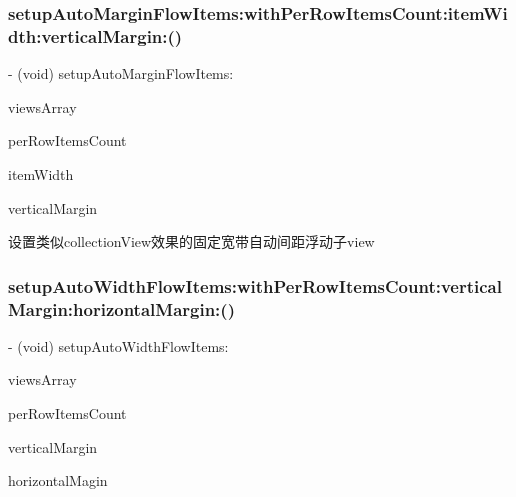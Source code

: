 \subsubsection{\texorpdfstring{setup\+Auto\+Margin\+Flow\+Items\+:with\+Per\+Row\+Items\+Count\+:item\+Width\+:vertical\+Margin\+:()}{setupAutoMarginFlowItems:withPerRowItemsCount:itemWidth:verticalMargin:()}\hspace{0.1cm}{\footnotesize\ttfamily [3/3]}}
{\footnotesize\ttfamily -\/ (void) setup\+Auto\+Margin\+Flow\+Items\+: \begin{DoxyParamCaption}\item[{(N\+S\+Array $\ast$)}]{views\+Array }\item[{withPerRowItemsCount:(N\+S\+Integer)}]{per\+Row\+Items\+Count }\item[{itemWidth:(C\+G\+Float)}]{item\+Width }\item[{verticalMargin:(C\+G\+Float)}]{vertical\+Margin }\end{DoxyParamCaption}}

设置类似collection\+View效果的固定宽带自动间距浮动子view \mbox{\label{category_u_i_view_07_s_d_layout_extention_08_acf79adf5d8aee91802214b32de9bc6ec}} 
\subsubsection{\texorpdfstring{setup\+Auto\+Width\+Flow\+Items\+:with\+Per\+Row\+Items\+Count\+:vertical\+Margin\+:horizontal\+Margin\+:()}{setupAutoWidthFlowItems:withPerRowItemsCount:verticalMargin:horizontalMargin:()}\hspace{0.1cm}{\footnotesize\ttfamily [1/3]}}
{\footnotesize\ttfamily -\/ (void) setup\+Auto\+Width\+Flow\+Items\+: \begin{DoxyParamCaption}\item[{(N\+S\+Array $\ast$)}]{views\+Array }\item[{withPerRowItemsCount:(N\+S\+Integer)}]{per\+Row\+Items\+Count }\item[{verticalMargin:(C\+G\+Float)}]{vertical\+Margin }\item[{horizontalMargin:(C\+G\+Float)}]{horizontal\+Magin }\end{DoxyParamCaption}}


